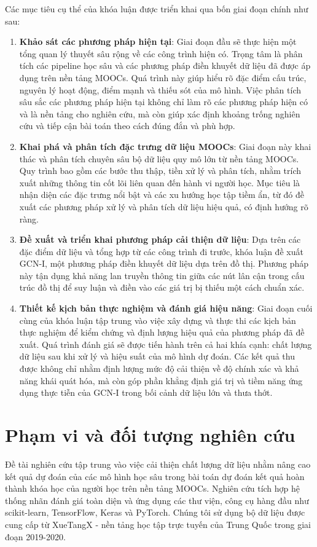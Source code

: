 Các mục tiêu cụ thể của khóa luận được triển khai qua bốn giai đoạn chính như sau:
\begin{enumerate}
    \item \textbf{Khảo sát các phương pháp hiện tại}: Giai đoạn đầu sẽ thực hiện một tổng quan lý thuyết sâu rộng về các công trình hiện có. Trọng tâm là phân tích các pipeline học sâu và các phương pháp điền khuyết dữ liệu đã được áp dụng trên nền tảng MOOCs. Quá trình này giúp hiểu rõ đặc điểm cấu trúc, nguyên lý hoạt động, điểm mạnh và thiếu sót của mô hình. Việc phân tích sâu sắc các phương pháp hiện tại không chỉ làm rõ các phương pháp hiện có và là nền tảng cho nghiên cứu, mà còn giúp xác định khoảng trống nghiên cứu và tiếp cận bài toán theo cách đúng đắn và phù hợp.
    \item \textbf{Khai phá và phân tích đặc trưng dữ liệu MOOCs}: Giai đoạn này khai thác và phân tích chuyên sâu bộ dữ liệu quy mô lớn từ nền tảng MOOCs. Quy trình bao gồm các bước thu thập, tiền xử lý và phân tích, nhằm trích xuất những thông tin cốt lõi liên quan đến hành vi người học. Mục tiêu là nhận diện các đặc trưng nổi bật và các xu hướng học tập tiềm ẩn, từ đó đề xuất các phương pháp xử lý và phân tích dữ liệu hiệu quả, có định hướng rõ ràng.

    \item \textbf{Đề xuất và triển khai phương pháp cải thiện dữ liệu}: Dựa trên các đặc điểm dữ liệu và tổng hợp từ các công trình đi trước, khóa luận đề xuất GCN-I, một phương pháp điền khuyết dữ liệu dựa trên đồ thị. Phương pháp này tận dụng khả năng lan truyền thông tin giữa các nút lân cận trong cấu trúc đồ thị để suy luận và điền vào các giá trị bị thiếu một cách chuẩn xác.

    \item \textbf{Thiết kế kịch bản thực nghiệm và đánh giá hiệu năng}: Giai đoạn cuối cùng của khóa luận tập trung vào việc xây dựng và thực thi các kịch bản thực nghiệm để kiểm chứng và định lượng hiệu quả của phương pháp đã đề xuất. Quá trình đánh giá sẽ được tiến hành trên cả hai khía cạnh: chất lượng dữ liệu sau khi xử lý và hiệu suất của mô hình dự đoán. Các kết quả thu được không chỉ nhằm định lượng mức độ cải thiện về độ chính xác và khả năng khái quát hóa, mà còn góp phần khẳng định giá trị và tiềm năng ứng dụng thực tiễn của GCN-I trong bối cảnh dữ liệu lớn và thưa thớt.
\end{enumerate}
\section{Phạm vi và đối tượng nghiên cứu}
Đề tài nghiên cứu tập trung vào việc cải thiện chất lượng dữ liệu nhằm nâng cao kết quả dự đoán của các mô hình học sâu trong bài toán dự đoán kết quả hoàn thành khóa học của người học trên nền tảng MOOCs. Nghiên cứu tích hợp hệ thống nhãn đánh giá toàn diện và ứng dụng các thư viện, công cụ hàng đầu như scikit-learn, TensorFlow, Keras và PyTorch. Chúng tôi sử dụng bộ dữ liệu được cung cấp từ XueTangX - nền tảng học tập trực tuyến của Trung Quốc trong giai đoạn 2019-2020.

